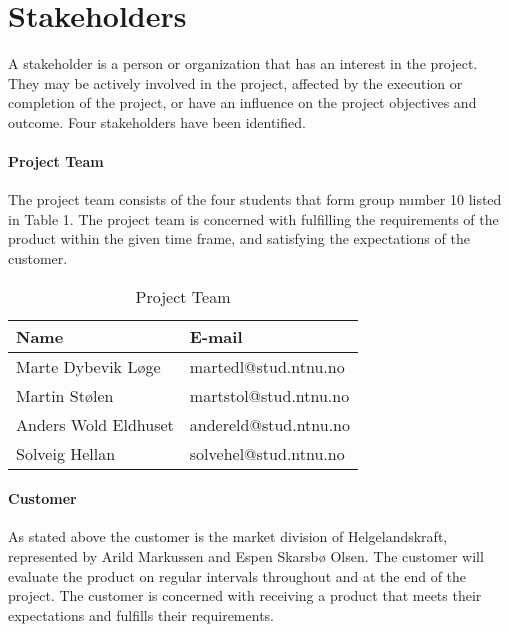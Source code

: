 \section{Stakeholders}

A stakeholder is a person or organization that has an interest in the project. They may be actively involved in the project, affected by the execution or completion of the project, or have an influence on the project objectives and outcome. Four stakeholders have been identified. \cite{stakeholder}


\paragraph{Project Team}

The project team consists of the four students that form group number 10 listed in Table 1. The project team is concerned with fulfilling the requirements of the product within the given time frame, and satisfying the expectations of the customer.


\begin{table}[H]
\begin{center}
    \begin{tabular}{| l | l |}
   	\hline
    \rowcolor{gray}
    {\bf Name} & {\bf E-mail} \\ \hline
    Marte Dybevik Løge & martedl@stud.ntnu.no \\ \hline
    Martin Stølen & martstol@stud.ntnu.no \\ \hline
    Anders Wold Eldhuset & andereld@stud.ntnu.no \\ \hline
    Solveig Hellan & solvehel@stud.ntnu.no \\ 
    \hline
    \end{tabular}
\end{center}

\caption{Project Team}
\end{table}

\paragraph{Customer}

As stated above the customer is the market division of Helgelandskraft, represented by Arild Markussen and Espen Skarsbø Olsen. The customer will evaluate the product on regular intervals throughout and at the end of the project. The customer is concerned with receiving a product that meets their expectations and fulfills their requirements.

